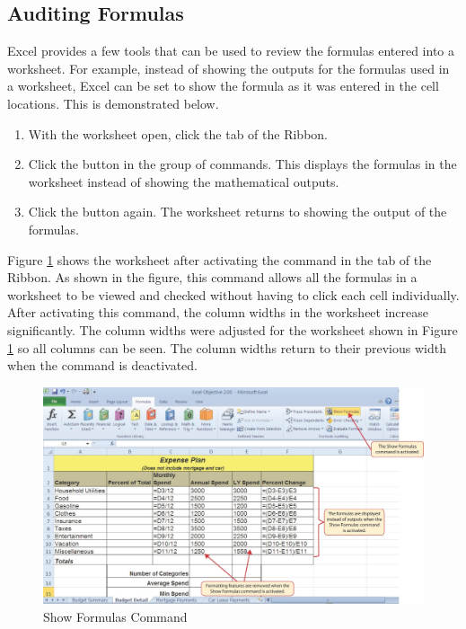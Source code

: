 \subsection{Auditing Formulas}

Excel provides a few tools that can be used to review the formulas entered into a worksheet. For example, instead of showing the outputs for the formulas used in a worksheet, Excel can be set to show the formula as it was entered in the cell locations. This is demonstrated below.

\begin{enumerate}
	\item With the  worksheet open, click the  tab of the Ribbon.
	\item Click the  button in the  group of commands. This displays the formulas in the worksheet instead of showing the mathematical outputs.
	\item Click the  button again. The worksheet returns to showing the output of the formulas.
\end{enumerate}

Figure \ref{02:fig08} shows the  worksheet after activating the  command in the  tab of the Ribbon. As shown in the figure, this command allows all the formulas in a worksheet to be viewed and checked without having to click each cell individually. After activating this command, the column widths in the worksheet increase significantly. The column widths were adjusted for the worksheet shown in Figure \ref{02:fig08} so all columns can be seen. The column widths return to their previous width when the  command is deactivated.

\begin{figure}[H]
	\centering
	\includegraphics[width=\maxwidth{.95\linewidth}]{gfx/ch02_fig08}
	\caption{Show Formulas Command}
	\label{02:fig08}
\end{figure}

